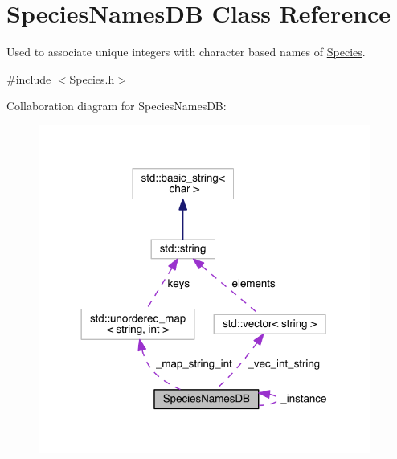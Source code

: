 \hypertarget{classSpeciesNamesDB}{\section{Species\+Names\+D\+B Class Reference}
\label{classSpeciesNamesDB}
}


Used to associate unique integers with character based names of \hyperlink{classSpecies}{Species}.  




{\ttfamily \#include $<$Species.\+h$>$}



Collaboration diagram for Species\+Names\+D\+B\+:\nopagebreak
\begin{figure}[H]
\begin{center}
\leavevmode
\includegraphics[width=309pt]{classSpeciesNamesDB__coll__graph}
\end{center}
\end{figure}
